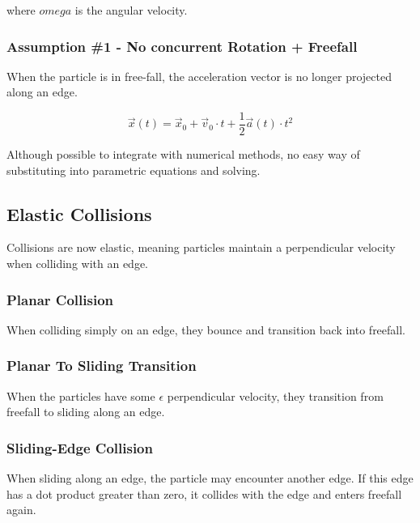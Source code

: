 where $omega$ is the angular velocity.

		\subsubsection{Assumption \#1 - No concurrent Rotation + Freefall}

When the particle is in free-fall, the acceleration vector is no longer projected along an edge.

$$
\vec{x}(t) = \vec{x}_0 + \vec{v}_{0} \cdot t + \frac{1}{2}\vec{a}(t)  \cdot t^2
$$

Although possible to integrate with numerical methods, no easy way of substituting into parametric equations and solving.


	\subsection{Elastic Collisions}

	Collisions are now elastic, meaning particles maintain a perpendicular velocity when colliding with an edge.

		\subsubsection{Planar Collision}

		When colliding simply on an edge, they bounce and transition back into freefall.


		\subsubsection{Planar To Sliding Transition}

		When the particles have some $\epsilon$ perpendicular velocity, they transition from freefall to sliding along an edge.


		\subsubsection{Sliding-Edge Collision}

		When sliding along an edge, the particle may encounter another edge. If this edge has a dot product greater than zero, it collides with the edge and enters freefall again.

